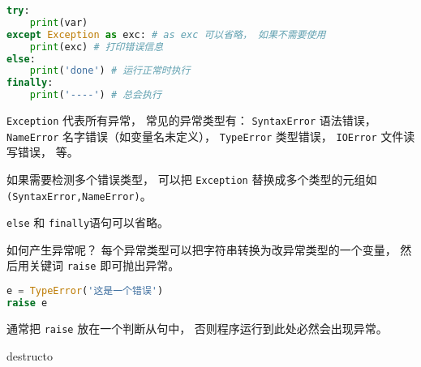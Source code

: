 
\begin{issues}
\issueDraft
\end{issues}

\begin{lstlisting}[language=python]
try:
    print(var)
except Exception as exc: # as exc 可以省略， 如果不需要使用
    print(exc) # 打印错误信息
else:
    print('done') # 运行正常时执行
finally:
    print('----') # 总会执行
\end{lstlisting}

\verb|Exception| 代表所有异常， 常见的异常类型有： \verb|SyntaxError| 语法错误， \verb|NameError| 名字错误（如变量名未定义）， \verb|TypeError| 类型错误， \verb|IOError| 文件读写错误， 等。

如果需要检测多个错误类型， 可以把 \verb|Exception| 替换成多个类型的元组如 \verb|(SyntaxError,NameError)|。

\verb|else| 和 \verb|finally|语句可以省略。

如何产生异常呢？ 每个异常类型可以把字符串转换为改异常类型的一个变量， 然后用关键词 \verb|raise| 即可抛出异常。
\begin{lstlisting}[language=python]
e = TypeError('这是一个错误')
raise e
\end{lstlisting}
通常把 \verb|raise| 放在一个判断从句中， 否则程序运行到此处必然会出现异常。

destructo
